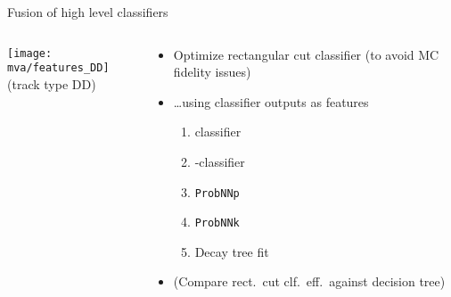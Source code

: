\begin{frame}{Fusion of high level classifiers}
    \begin{columns}
        \begin{column}{.5\textwidth}
            \centering
            \texttt{[image: mva/features\_DD]}\\
            (track type DD)
        \end{column}
        \begin{column}{.45\textwidth}
            \scalebox{1.2}{Fusion of high level classifiers}
            \begin{itemize}
                \item Optimize rectangular cut classifier (to avoid MC fidelity issues\ftntdagger)
                \item \ldots using classifier outputs as features
                \begin{enumerate}
                    \item \Lz classifier
                    \item \Lb-\Dz classifier
                    \item \texttt{ProbNNp}
                    \item \texttt{ProbNNk}
                    \item Decay tree fit
                \end{enumerate}
                \item (Compare rect.\ cut clf.\ eff.\ against decision tree\ftntdagger)
            \end{itemize}
        \end{column}
    \end{columns}
\end{frame}

